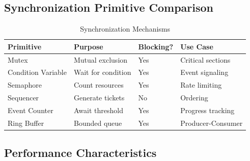 \documentclass[12pt,a4paper]{article}
\begin{document}
\begin{table}[H]
\centering
\caption{Feature Evolution Across Milestones}
\end{table}

\subsection{Synchronization Primitive Comparison}

\begin{table}[H]
\centering
\caption{Synchronization Mechanisms}
\begin{tabular}{@{}llll@{}}
\toprule
\textbf{Primitive} & \textbf{Purpose} & \textbf{Blocking?} & \textbf{Use Case} \\ \midrule
Mutex & Mutual exclusion & Yes & Critical sections \\
Condition Variable & Wait for condition & Yes & Event signaling \\
Semaphore & Count resources & Yes & Rate limiting \\
Sequencer & Generate tickets & No & Ordering \\
Event Counter & Await threshold & Yes & Progress tracking \\
Ring Buffer & Bounded queue & Yes & Producer-Consumer \\ \bottomrule
\end{tabular}
\end{table}

\subsection{Performance Characteristics}
\end{document}
